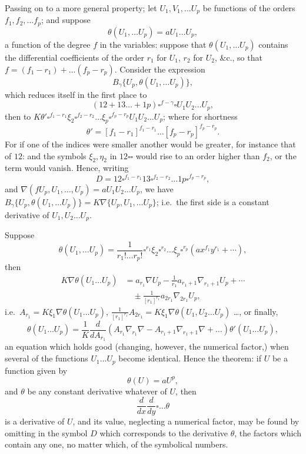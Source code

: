 \documentclass[12pt,a4paper]{article}
\begin{document}
\newpage
\setcounter{page}{110}

Passing on to a more general property; let $U_1, V_1, \ldots U_p$ be functions of the orders
$f_1, f_2, \ldots f_p$; and suppose
\[
\theta(U_1, \ldots U_p) = aU_1 \ldots U_p,
\]
a function of the degree $f$ in the variables: suppose that $\theta(U_1, \ldots U_p)$ contains the
differential coefficients of the order $r_1$ for $U_1$, $r_2$ for $U_2$, \&c., so that $f = (f_1 - r_1) + \ldots (f_p - r_p)$.
Consider the expression
\[
B_{\gamma}\{U_p, \theta(U_1, \ldots U_p)\},
\]
which reduces itself in the first place to
\[
(12 + 13 \ldots + 1p)\square^{f-\gamma} \square U_1 U_2 \ldots U_p,
\]
then to $K \theta' \square^{f_1-r_1} \xi_2 \square^{f_2-r_2} \ldots \xi_p \square^{f_p-r_p} U_1 U_2 \ldots U_p$;
where for shortness
\[
\theta' = [f_1-r_1]^{f_1-r_1} \ldots [f_p-r_p]^{f_p-r_p}.
\]
For if one of the indices were smaller another would be greater, for instance that of
$12$: and the symbols $\xi_2, \eta_2$ in $12 \square \square$ would rise to an order higher than $f_2$, or
the term would vanish. Hence, writing
\[
D = 12 \square^{f_1-r_1} 13 \square^{f_2-r_2} \ldots 1p \square^{f_p-r_p},
\]
and $\nabla(fU_p, U_1, \ldots, U_p) = aU_1 U_2 \ldots U_p$,
we have $B_{\gamma}\{U_p, \theta(U_1, \ldots U_p)\} = K \nabla\{U_p, U_1, \ldots U_p\}$;
i.e.\ the first side is a constant derivative of $U_1, U_2 \ldots U_p$.

Suppose
\[
\theta(U_1, \ldots U_p) = \frac{1}{r_1! \ldots r_p!} \square^{r_1} \xi_2 \square^{r_2} \ldots \xi_p \square^{r_p} (a x^{f_1} y^{r_1} + \cdots),
\]
then
\begin{align*}
K \nabla \theta(U_1 \ldots U_p) &= a_{r_1} \nabla U_p - \frac{1}{r_1} a_{r_1+1} \nabla_{r_1+1} U_p + \cdots\\
&\quad \pm \frac{1}{[r_1]^{r_1}} a_{2r_1} \nabla_{2r_1} U_p,
\end{align*}
i.e.\ $A_{r_1} = K \xi_1 \nabla \theta(U_1 \ldots U_p)$, $\frac{1}{[r_1]^{r_1}} A_{2r_1} = K \xi_1 \nabla \theta(U_1, U_2 \ldots U_p)$ \ldots,
or finally,
\[
\theta(U_1 \ldots U_p) = \frac{1}{K} \frac{d}{dA_{r_1}} (A_{r_1} \nabla_{r_1} \nabla - A_{r_1+1} \nabla_{r_1+1} \nabla + \ldots) \theta'(U_1 \ldots U_p),
\]
an equation which holds good (changing, however, the numerical factor,) when several
of the functions $U_1 \ldots U_p$ become identical. Hence the theorem: if $U$ be a function
given by
\[
\theta(U) = aU^p,
\]
and $\theta$ be any constant derivative whatever of $U$, then
\[
\frac{d}{dx} \frac{d}{dy} \square \ldots \theta
\]
is a derivative of $U$, and its value, neglecting a numerical factor, may be found by
omitting in the symbol $D$ which corresponds to the derivative $\theta$, the factors which
contain any one, no matter which, of the symbolical numbers.
\end{document}
